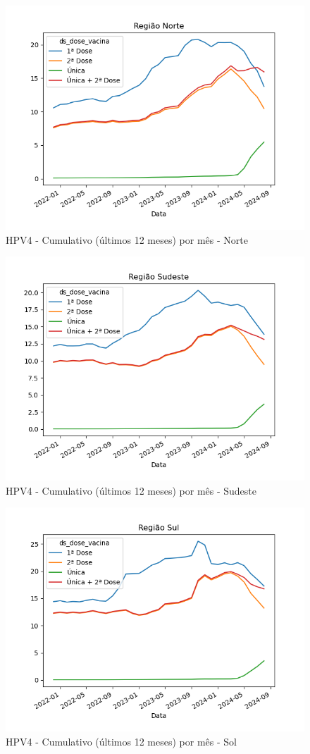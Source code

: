 \documentclass[12pt]{article}
\begin{document}
\begin{figure}[H]
    \centering
    \includegraphics[width=0.85\linewidth]{imagens/HPV4-Norte-Cumulativo-mes}
    \caption{HPV4 - Cumulativo (últimos 12 meses) por mês - Norte}
    \label{fig:HPV4-norte-cumulativo-mes}
\end{figure}
\begin{figure}[H]
    \centering
    \includegraphics[width=0.85\linewidth]{imagens/HPV4-Sudeste-Cumulativo-mes}
    \caption{HPV4 - Cumulativo (últimos 12 meses) por mês - Sudeste}
    \label{fig:HPV4-sudeste-cumulativo-mes}
\end{figure}
\begin{figure}[H]
    \centering
    \includegraphics[width=0.85\linewidth]{imagens/HPV4-Sul-Cumulativo-mes}
    \caption{HPV4 - Cumulativo (últimos 12 meses) por mês - Sol}
    \label{fig:HPV4-sul-cumulativo-mes}
\end{figure}
\end{document}
